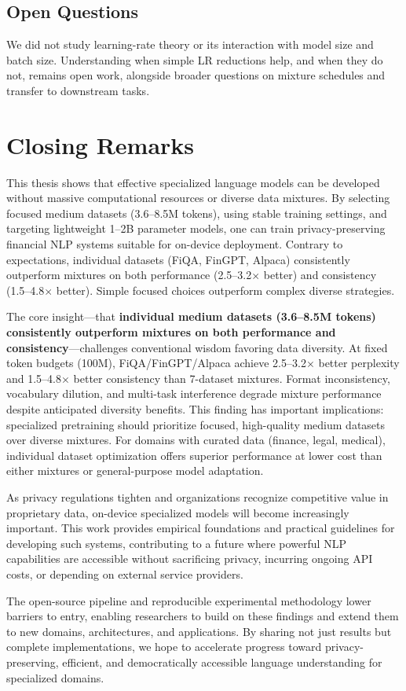 \subsection{Open Questions}

We did not study learning-rate theory or its interaction with model size and batch size. Understanding when simple LR reductions help, and when they do not, remains open work, alongside broader questions on mixture schedules and transfer to downstream tasks.

\section{Closing Remarks}

This thesis shows that effective specialized language models can be developed without massive computational resources or diverse data mixtures. By selecting focused medium datasets (3.6–8.5M tokens), using stable training settings, and targeting lightweight 1–2B parameter models, one can train privacy-preserving financial NLP systems suitable for on-device deployment. Contrary to expectations, individual datasets (FiQA, FinGPT, Alpaca) consistently outperform mixtures on both performance (2.5–3.2$\times$ better) and consistency (1.5–4.8$\times$ better). Simple focused choices outperform complex diverse strategies.

The core insight—that \textbf{individual medium datasets (3.6–8.5M tokens) consistently outperform mixtures on both performance and consistency}—challenges conventional wisdom favoring data diversity. At fixed token budgets (100M), FiQA/FinGPT/Alpaca achieve 2.5–3.2$\times$ better perplexity and 1.5–4.8$\times$ better consistency than 7-dataset mixtures. Format inconsistency, vocabulary dilution, and multi-task interference degrade mixture performance despite anticipated diversity benefits. This finding has important implications: specialized pretraining should prioritize focused, high-quality medium datasets over diverse mixtures. For domains with curated data (finance, legal, medical), individual dataset optimization offers superior performance at lower cost than either mixtures or general-purpose model adaptation.

As privacy regulations tighten and organizations recognize competitive value in proprietary data, on-device specialized models will become increasingly important. This work provides empirical foundations and practical guidelines for developing such systems, contributing to a future where powerful NLP capabilities are accessible without sacrificing privacy, incurring ongoing API costs, or depending on external service providers.

The open-source pipeline and reproducible experimental methodology lower barriers to entry, enabling researchers to build on these findings and extend them to new domains, architectures, and applications. By sharing not just results but complete implementations, we hope to accelerate progress toward privacy-preserving, efficient, and democratically accessible language understanding for specialized domains.
